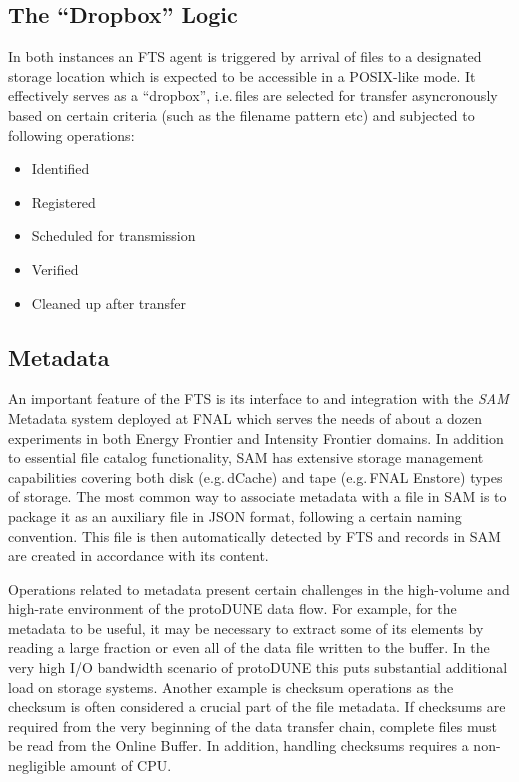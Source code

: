 \documentclass[a4paper]{jpconf}
\newcommand{\pd}{protoDUNE\xspace}
\begin{document}
\subsection{The ``Dropbox'' Logic}
In both instances an FTS agent is triggered by arrival of files to a designated
storage location which is expected to be accessible in a POSIX-like  mode.
It effectively serves as a ``dropbox'', i.e.\,files are selected
for transfer asyncronously based on certain criteria (such as the filename pattern etc)
and subjected to following operations:
\begin{itemize}
\item Identified
\item Registered
\item Scheduled for transmission
\item Verified
\item Cleaned up after transfer
\end{itemize}


\subsection{Metadata}
An important feature of the FTS is its interface to and integration with 
the \textit{SAM} Metadata system deployed at FNAL which serves the needs of
about a dozen
experiments in both Energy Frontier and Intensity Frontier domains.
In addition to essential file catalog
functionality, SAM has extensive storage management
capabilities covering both disk (e.g.\,dCache) and tape (e.g.\,FNAL Enstore) types of storage.
The most common way
to associate metadata with a file in SAM is to package it as an auxiliary file in JSON format,
following a certain naming convention. This file is then automatically detected by FTS
and records in SAM are created in accordance with its content.

Operations related to metadata present certain challenges in the high-volume and high-rate
environment of the \pd data flow. For example, for the metadata to be useful, it may
be necessary to extract some of its elements by reading a large fraction or even all of the data file
written to the buffer. In the very high I/O bandwidth scenario of \pd this puts substantial additional
load on storage systems. Another example is checksum operations as the checksum is often
considered a crucial part of the file metadata. If checksums are required from the very beginning
of the data transfer chain, complete files must be read from the Online Buffer. In addition, handling
checksums requires a non-negligible amount of CPU.
\end{document}
